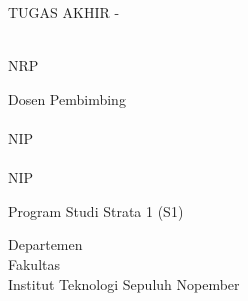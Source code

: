 \begin{large}
  TUGAS AKHIR - \coursecode{}
\end{large}

\vspace{\fill}

\begin{spacing}{1.5}
  \begin{Large}
    \tatitle{}
  \end{Large}
\end{spacing}

\vspace{\fill}

\begin{large}
  \name{} \\
  \textmd{NRP \nrp{}}
\end{large}

\vspace{\fill}

\begin{large}
  \textmd{Dosen Pembimbing} \\
  \advisor{} \\
  \textmd{NIP \advisornip{}} \\
  \coadvisor{} \\
  \textmd{NIP \coadvisornip{}}
\end{large}

\vspace{\fill}

Program Studi Strata 1 (S1) \studyprogram{} \\

\mdseries

Departemen \department{} \\
Fakultas \faculty{} \\
Institut Teknologi Sepuluh Nopember

\place{} \\ \the\year{}
